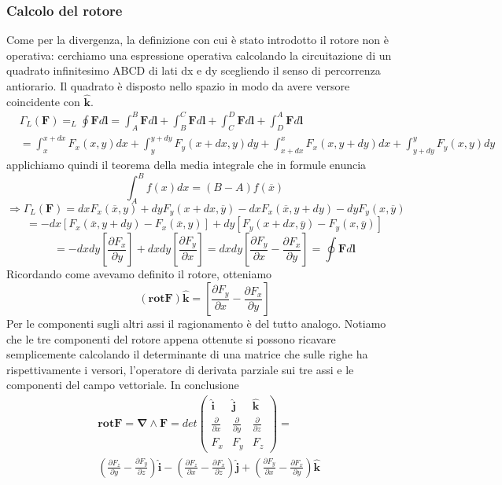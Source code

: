 \documentclass[10pt,a4paper]{article}
\begin{document}
\subsubsection{Calcolo del rotore}
Come per la divergenza, la definizione con cui è stato introdotto il rotore non è operativa: cerchiamo una espressione operativa calcolando la circuitazione di un quadrato infinitesimo ABCD di lati dx e dy scegliendo il senso di percorrenza antiorario. Il quadrato è disposto nello spazio in modo da avere versore coincidente con $\hat{\mathbf{k}}$. 
\begin{align*}
	&\Gamma_L(\mathbf{F}) = _L\oint \mathbf{F} d\mathbf{l} = \int_{A}^{B} \mathbf{F} d\mathbf{l}+\int_{B}^{C} \mathbf{F} d\mathbf{l}+\int_{C}^{D} \mathbf{F} d\mathbf{l}+\int_{D}^{A} \mathbf{F} d\mathbf{l}\\
	&= \int_{x}^{x+dx} F_x(x,y) dx+\int_{y}^{y+dy} F_y(x+dx,y) dy+\int_{x+dx}^{x} F_x(x, y+dy) dx+\int_{y+dy}^{y} F_y(x, y) dy
\end{align*}  
applichiamo quindi il teorema della media integrale che in formule enuncia
\[\int_{A}^{B}f(x)dx=(B-A)f(\overline{x})\]
\[\Rightarrow\Gamma_L(\mathbf{F}) = dxF_x(\overline{x}, y)+dyF_y(x+dx, \overline{y})-dxF_x(\overline{x}, y+dy)-dyF_y(x, \overline{y})\]
\[=-dx[F_x(\overline{x}, y+dy)-F_x(\overline{x}, y)]+dy[F_y(x+dx, \overline{y})-F_y(x, \overline{y})]\]
\[=-dxdy\left[\frac{\partial F_x}{\partial y}\right]+dxdy\left[\frac{\partial F_y}{\partial x}\right] = dxdy\left[\frac{\partial F_y}{\partial x}-\frac{\partial F_x}{\partial y}\right]=\oint\mathbf{F}d\mathbf{l}\]
Ricordando come avevamo definito il rotore, otteniamo 
\[(\mathbf{rot}\mathbf{F})\hat{\mathbf{k}} = \left[\frac{\partial F_y}{\partial x}-\frac{\partial F_x}{\partial y}\right]\]
Per le componenti sugli altri assi il ragionamento è del tutto analogo. Notiamo che le tre componenti del rotore appena ottenute si possono ricavare semplicemente calcolando il determinante di una matrice che sulle righe ha rispettivamente i versori, l'operatore di derivata parziale sui tre assi e le componenti del campo vettoriale. In conclusione
\begin{align*}
&\mathbf{rot}\mathbf{F}=\mathbf{\nabla}\wedge\mathbf{F}=det
\begin{pmatrix}
	\hat{\mathbf{i}}&\hat{\mathbf{j}}&\hat{\mathbf{k}}\\
	\frac{\partial}{\partial x}&\frac{\partial}{\partial y}&\frac{\partial}{\partial z}\\
	F_x&F_y&F_z
\end{pmatrix}=\\
&(\frac{\partial F_z}{\partial y}-\frac{\partial F_y}{\partial z})\hat{\mathbf{i}}
-(\frac{\partial F_z}{\partial x}-\frac{\partial F_x}{\partial z})\hat{\mathbf{j}}
+(\frac{\partial F_y}{\partial x}-\frac{\partial F_x}{\partial y})\hat{\mathbf{k}}
\end{align*}
\end{document}
